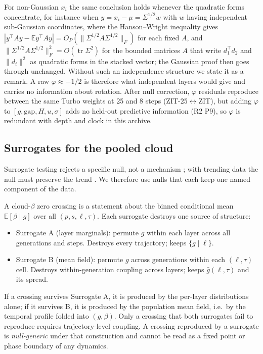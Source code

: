 \documentclass[11pt]{article}
\theoremstyle{definition}
\newcommand{\tr}{\operatorname{tr}}
\newcommand{\E}{\mathbb{E}}
\newcommand{\gap}{\mathrm{gap}}
\newcommand{\TT}{ZIT-25}%
\begin{document}
For non-Gaussian $x_i$ the same conclusion holds whenever the quadratic forms concentrate, for instance when $y=x_i-\mu=\Sigma^{1/2}w$ with $w$ having independent sub-Gaussian coordinates, where the Hanson--Wright inequality \citep{rudelson2013hanson} gives $|y^\top Ay-\E y^\top Ay|=O_P(\|\Sigma^{1/2}A\Sigma^{1/2}\|_F)$ for each fixed $A$, and $\|\Sigma^{1/2}A\Sigma^{1/2}\|_F^2=O(\tr\Sigma^2)$ for the bounded matrices $A$ that write $d_1^\top d_2$ and $\|d_i\|^2$ as quadratic forms in the stacked vector; the Gaussian proof then goes through unchanged. Without such an independence structure we state it as a remark. A raw $\varphi\approx-1/2$ is therefore what independent layers would give and carries no information about rotation. After null correction, $\varphi$ residuals reproduce between the same Turbo weights at 25 and 8 steps (\TT{}$\leftrightarrow$ZIT), but adding $\varphi$ to $[g,\gap,H,u,\sigma]$ adds no held-out predictive information (R2 P9), so $\varphi$ is redundant with depth and clock in this archive.

\subsection{Surrogates for the pooled cloud}
Surrogate testing rejects a specific null, not a mechanism \citep{theiler1992testing,schreiber2000surrogate,lancaster2018surrogate}; with trending data the null must preserve the trend \citep{nakamura2005small,harris2020nonsense}. We therefore use nulls that each keep one named component of the data.

A cloud-$\beta$ zero crossing is a statement about the binned conditional mean $\E[\beta\mid g]$ over all $(p,s,\ell,\tau)$. Each surrogate destroys one source of structure:
\begin{itemize}
 \item Surrogate A (layer marginals): permute $g$ within each layer across all generations and steps. Destroys every trajectory; keeps $\{g\mid\ell\}$.
 \item Surrogate B (mean field): permute $g$ across generations within each $(\ell,\tau)$ cell. Destroys within-generation coupling across layers; keeps $\bar g(\ell,\tau)$ and its spread.
\end{itemize}
If a crossing survives Surrogate A, it is produced by the per-layer distributions alone; if it survives B, it is produced by the population mean field, i.e.\ by the temporal profile folded into $(g,\beta)$. Only a crossing that both surrogates fail to reproduce requires trajectory-level coupling. A crossing reproduced by a surrogate is \emph{null-generic} under that construction and cannot be read as a fixed point or phase boundary of any dynamics.
\end{document}
